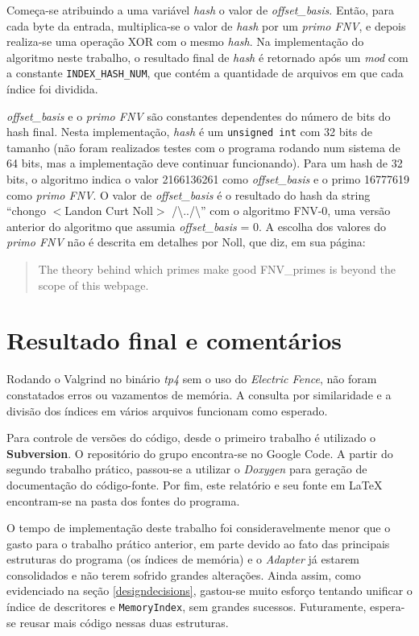 \documentclass[a4paper,10pt]{article}
\begin{document}
Começa-se atribuindo a uma variável \textit{hash} o valor de \textit{offset\_basis}. Então, para cada byte da entrada, multiplica-se o valor de \textit{hash} por um \textit{primo FNV}, e depois realiza-se uma operação XOR com o mesmo \textit{hash}. Na implementação do algoritmo neste trabalho, o resultado final de \textit{hash} é retornado após um \textit{mod} com a constante \texttt{INDEX\_HASH\_NUM}, que contém a quantidade de arquivos em que cada índice foi dividida.

\textit{offset\_basis} e o \textit{primo FNV} são constantes dependentes do número de bits do hash final. Nesta implementação, \textit{hash} é um \texttt{unsigned int} com 32 bits de tamanho (não foram realizados testes com o programa rodando num sistema de 64 bits, mas a implementação deve continuar funcionando). Para um hash de 32 bits, o algoritmo indica o valor 2166136261 como \textit{offset\_basis} e o primo 16777619 como \textit{primo FNV}. O valor de \textit{offset\_basis} é o resultado do hash da string ``chongo $<$Landon Curt Noll$>$ /\textbackslash../\textbackslash'' com o algoritmo FNV-0, uma versão anterior do algoritmo que assumia \textit{offset\_basis} = 0. A escolha dos valores do \textit{primo FNV} não é descrita em detalhes por Noll, que diz, em sua página:

\begin{quote}
The theory behind which primes make good FNV\_primes is beyond the scope of this webpage.
\end{quote}

\section{Resultado final e comentários}
Rodando o Valgrind no binário \textit{tp4} sem o uso do \textit{Electric Fence}, não foram constatados erros ou vazamentos de memória. A consulta por similaridade e a divisão dos índices em vários arquivos funcionam como esperado.

Para controle de versões do código, desde o primeiro trabalho é utilizado o \textbf{Subversion}. O repositório do grupo encontra-se no Google Code\cite{googlecode}. A partir do segundo trabalho prático, passou-se a utilizar o \textit{Doxygen} para geração de documentação do código-fonte. Por fim, este relatório e seu fonte em LaTeX encontram-se na pasta dos fontes do programa.

O tempo de implementação deste trabalho foi consideravelmente menor que o gasto para o trabalho prático anterior, em parte devido ao fato das principais estruturas do programa (os índices de memória) e o \textit{Adapter} já estarem consolidados e não terem sofrido grandes alterações. Ainda assim, como evidenciado na seção \ref{designdecisions}, gastou-se muito esforço tentando unificar o índice de descritores e \texttt{MemoryIndex}, sem grandes sucessos. Futuramente, espera-se reusar mais código nessas duas estruturas.
\end{document}
